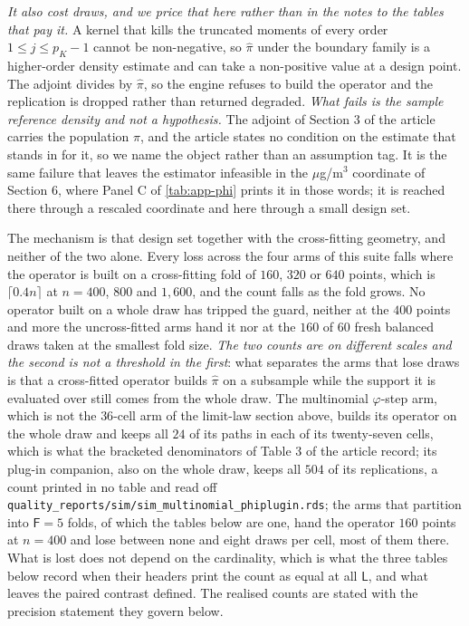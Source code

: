 \documentclass[
  12pt]{article}
\newcommand{\1}[1]{\mathds{1}\left[#1\right]}
\theoremstyle{plain}
\theoremstyle{definition}
\theoremstyle{definition}
\theoremstyle{remark}
\begin{document}
\emph{It also cost draws, and we price that here rather than in the notes to the
tables that pay it.} A kernel that kills the truncated moments of every order
$1\le j\le p_K-1$ cannot be non-negative, so $\hat\pi$ under the boundary family
is a higher-order density estimate and can take a non-positive value at a design
point. The adjoint divides by $\hat\pi$, so the engine refuses to build the
operator and the replication is dropped rather than returned degraded. \emph{What
fails is the sample reference density and not a hypothesis.} The adjoint of
Section 3 of the article carries the population $\pi$, and the article states no condition on
the estimate that stands in for it, so we name the object rather than an
assumption tag. It is the same failure that leaves the estimator infeasible in
the $\mu$g/m$^3$ coordinate of Section 6, where Panel C of \cref{tab:app-phi}
prints it in those words; it is reached there through a rescaled coordinate and
here through a small design set.

The mechanism is that design set together with the cross-fitting geometry, and
neither of the two alone. Every loss across the four arms of this suite falls
where the operator is built on a cross-fitting fold of $160$, $320$ or $640$
points, which is $\lceil0.4n\rceil$ at $n=400$, $800$ and $1{,}600$, and the count
falls as the fold grows. No operator built on a whole draw has tripped the guard,
neither at the $400$ points and more the uncross-fitted arms hand it nor at the
$160$ of $60$ fresh balanced draws taken at the smallest fold size. \emph{The two
counts are on different scales and the second is not a threshold in the first}:
what separates the arms that lose draws is that a cross-fitted operator builds
$\hat\pi$ on a subsample while the support it is evaluated over still comes from
the whole draw. The multinomial $\varphi$-step
arm, which is not the $36$-cell arm of the limit-law section above, builds its operator on
the whole draw and keeps all $24$ of its paths in each of its twenty-seven cells,
which is what the bracketed denominators of Table 3 of the article
record; its plug-in companion, also on the whole draw, keeps all $504$ of its
replications, a count printed in no table and read off
\texttt{quality\_reports/sim/sim\_multinomial\_phiplugin.rds}; the arms that
partition into $\mathsf F=5$ folds, of which the tables below are one, hand the
operator $160$ points at $n=400$ and lose between none and eight draws per cell,
most of them there. What is lost does not depend on the cardinality, which is
what the three tables below record when their headers print the count as equal
at all $\mathsf L$, and what leaves the paired contrast defined. The realised
counts are stated with the precision statement they govern below.
\end{document}
